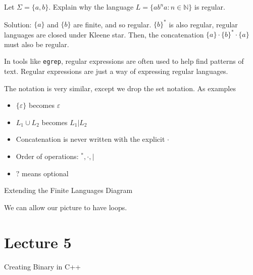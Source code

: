 \documentclass{article}
\begin{document}
Let \(\Sigma = \{a,b\}\). Explain why the language
\(L = \{ab^na: n \in \mathbb{N}\}\) is regular.

Solution: \(\{a\}\) and \(\{b\}\) are finite, and so regular.
\(\{b\}^*\) is also regular, regular languages are closed under Kleene
star. Then, the concatenation \(\{a\} \cdot \{b\}^* \cdot \{a\}\) must
also be regular.

In tools like \texttt{egrep}, regular expressions are often used to help
find patterns of text. Regular expressions are just a way of expressing
regular languages.

The notation is very similar, except we drop the set notation. As
examples

\begin{itemize}
    \item \(\{\varepsilon\}\) becomes \(\varepsilon\)
    \item \(L_1 \cup L_2\) becomes \(L_1 | L_2\)
    \item Concatenation is never written
with the explicit \(\cdot\)
    \item Order of operations: \(^*, \cdot, |\)
    \item \(?\) means optional
\end{itemize}


Extending the Finite Languages Diagram

We can allow our picture to have loops.


\section{Lecture 5}\label{lecture-5}

Creating Binary in C++
\end{document}
